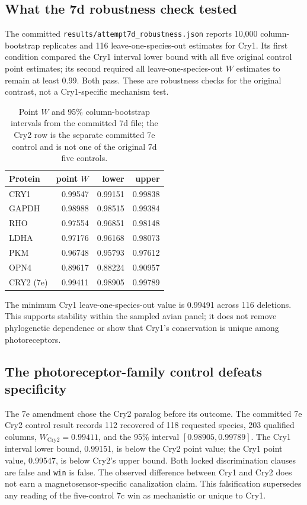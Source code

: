 \subsection{What the 7d robustness check tested}
The committed \texttt{results/attempt7d\_robustness.json} reports 10,000 column-bootstrap replicates and 116 leave-one-species-out estimates for Cry1. Its first condition compared the Cry1 interval lower bound with all five original control point estimates; its second required all leave-one-species-out $W$ estimates to remain at least 0.99. Both pass. These are robustness checks for the original contrast, not a Cry1-specific mechanism test.\begin{table}[!htbp]\centering\small\caption{Point $W$ and 95\% column-bootstrap intervals from the committed 7d file; the Cry2 row is the separate committed 7e control and is not one of the original 7d five controls.}\begin{tabular}{lrrr}\hline Protein & point $W$ & lower & upper \\\hline
CRY1 & 0.99547 & 0.99151 & 0.99838 \\
GAPDH & 0.98988 & 0.98515 & 0.99384 \\
RHO & 0.97554 & 0.96851 & 0.98148 \\
LDHA & 0.97176 & 0.96168 & 0.98073 \\
PKM & 0.96748 & 0.95793 & 0.97612 \\
OPN4 & 0.89617 & 0.88224 & 0.90957 \\
CRY2 (7e) & 0.99411 & 0.98905 & 0.99789 \\\hline\end{tabular}\end{table}
The minimum Cry1 leave-one-species-out value is 0.99491 across 116 deletions. This supports stability within the sampled avian panel; it does not remove phylogenetic dependence or show that Cry1's conservation is unique among photoreceptors.
\subsection{The photoreceptor-family control defeats specificity}
The 7e amendment chose the Cry2 paralog before its outcome. The committed 7e Cry2 control result records 112 recovered of 118 requested species, 203 qualified columns, $W_{\mathrm{Cry2}}=0.99411$, and the 95\% interval $[0.98905,0.99789]$. The Cry1 interval lower bound, 0.99151, is below the Cry2 point value; the Cry1 point value, 0.99547, is below Cry2's upper bound. Both locked discrimination clauses are false and \texttt{win} is false. The observed difference between Cry1 and Cry2 does not earn a magnetosensor-specific canalization claim. This falsification supersedes any reading of the five-control 7c win as mechanistic or unique to Cry1.
